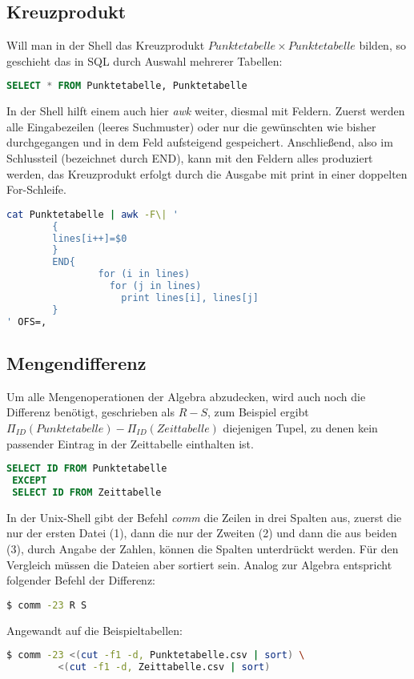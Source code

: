 \subsection{Kreuzprodukt}
Will man in der Shell das Kreuzprodukt
$Punktetabelle \times Punktetabelle$
bilden, so geschieht das in SQL durch Auswahl mehrerer Tabellen:
\begin{lstlisting}[language=SQL]
 SELECT * FROM Punktetabelle, Punktetabelle
\end{lstlisting}
In der Shell hilft einem auch hier \textit{awk} weiter, diesmal mit Feldern. Zuerst werden alle Eingabezeilen (leeres Suchmuster) oder nur die gewünschten wie bisher durchgegangen und in dem Feld aufsteigend gespeichert. 
Anschließend, also im Schlussteil (bezeichnet durch END), kann mit den Feldern alles produziert werden, das Kreuzprodukt erfolgt durch die Ausgabe mit print in einer doppelten For-Schleife.
\begin{lstlisting}[language=Bash]
cat Punktetabelle | awk -F\| '
        {
		lines[i++]=$0
        }
        END{
                for (i in lines)
                  for (j in lines)
                    print lines[i], lines[j]
        }
' OFS=,
\end{lstlisting}
\subsection{Mengendifferenz}
Um alle Mengenoperationen der Algebra abzudecken, wird auch noch die Differenz benötigt, geschrieben als $R-S$, zum Beispiel ergibt $\Pi_{ID}(Punktetabelle) - \Pi_{ID}(Zeittabelle)$ diejenigen Tupel, zu denen kein passender Eintrag in der Zeittabelle einthalten ist.
\begin{lstlisting}[language=SQL]
 SELECT ID FROM Punktetabelle
 EXCEPT
 SELECT ID FROM Zeittabelle
\end{lstlisting}
In der Unix-Shell gibt der Befehl \textit{comm} die Zeilen in drei Spalten aus, zuerst die nur der ersten Datei (1), dann die nur der Zweiten (2) und dann die aus beiden (3), durch Angabe der Zahlen, können die Spalten unterdrückt werden. Für den Vergleich müssen die Dateien aber sortiert sein.
Analog zur Algebra entspricht folgender Befehl der Differenz:
\begin{lstlisting}[language=Bash]
$ comm -23 R S
\end{lstlisting}
Angewandt auf die Beispieltabellen:
\begin{lstlisting}[language=Bash]
$ comm -23 <(cut -f1 -d, Punktetabelle.csv | sort) \
		 <(cut -f1 -d, Zeittabelle.csv | sort)
\end{lstlisting}

